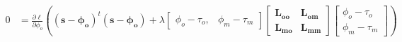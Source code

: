         \begin{align}
            0 &= \frac{\partial\ell}{\partial\phi_o}\left((\mathbf{s} - \mathbf{\phi_o}
                )^t(\mathbf{s} - \mathbf{\phi_o}) + \lambda
                \begin{bmatrix}
                    \phi_o - \tau_o, & \phi_m - \tau_m
                \end{bmatrix}
                \begin{bmatrix}
                    \mathbf{L_{oo}} & \mathbf{L_{om}} \\ \mathbf{L_{mo}} & \mathbf{L_{mm}}
                \end{bmatrix}
                \begin{bmatrix}
                    \phi_o - \tau_o \\ \phi_m - \tau_m
                \end{bmatrix}\right)\\

\end{align}
